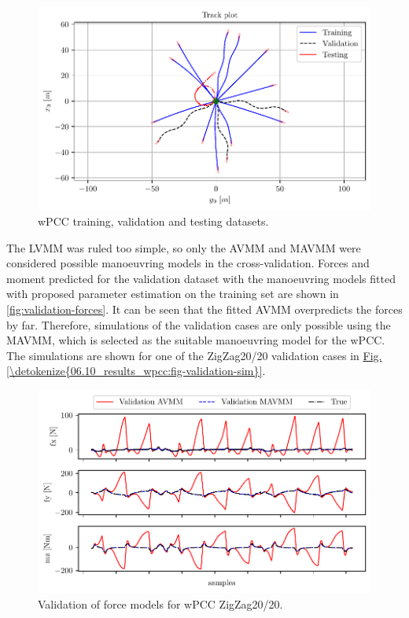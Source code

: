 \begin{figure}[!htb]
\centering
\includegraphics[width=\linewidth]{kappa/images/3.pdf}
\caption{wPCC training, validation and testing datasets.}
\label{fig:wpcc_datasets}
\end{figure}

The LVMM was ruled too simple, so only the AVMM and MAVMM were considered possible manoeuvring models in the cross-validation.
Forces and moment predicted for the validation dataset with the manoeuvring models fitted with proposed parameter estimation on the training set are shown in \autoref{fig:validation-forces}. It can be seen that the fitted AVMM overpredicts the forces by far. Therefore, simulations of the validation cases are only possible using the MAVMM, which is selected as the suitable manoeuvring model for the wPCC.
The simulations are shown for one of the ZigZag20/20 validation cases in \hyperref[\detokenize{06.10_results_wpcc:fig-validation-sim}]{Fig.\@ \ref{\detokenize{06.10_results_wpcc:fig-validation-sim}}}.

\begin{figure}[!htb]
\centering
\includegraphics{kappa/images/7.pdf}
\caption{Validation of force models for wPCC ZigZag20/20.}\label{fig:validation-forces}
\end{figure}

